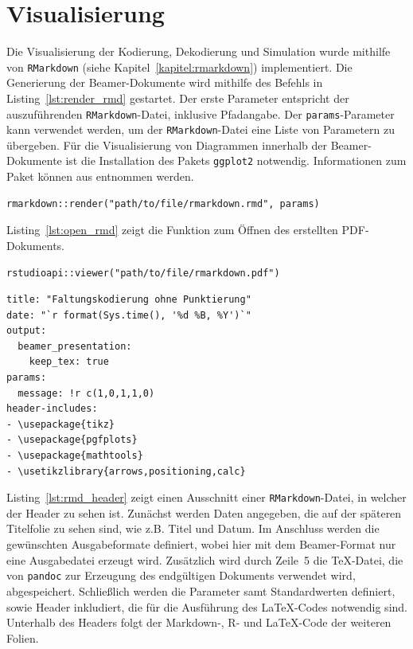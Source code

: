 \section{Visualisierung}
\label{kapitel:implementierung_visualisierung}
Die Visualisierung der Kodierung, Dekodierung und Simulation wurde mithilfe von \texttt{RMarkdown} (siehe Kapitel~\ref{kapitel:rmarkdown}) implementiert. Die Generierung der Beamer-Dokumente wird mithilfe des Befehls in Listing~\ref{lst:render_rmd} gestartet. Der erste Parameter entspricht der auszuführenden \texttt{RMarkdown}-Datei, inklusive Pfadangabe. Der \texttt{params}-Parameter kann verwendet werden, um der \texttt{RMarkdown}-Datei eine Liste von Parametern zu übergeben. Für die Visualisierung von Diagrammen innerhalb der Beamer-Dokumente ist die Installation des Pakets \texttt{ggplot2} notwendig. Informationen zum Paket können aus \cite{ggplot2} entnommen werden.
\begin{lstlisting}[caption=Erzeugen des Visualisierungs-Dokuments aus der RMD-Datei, label={lst:render_rmd}, float=!th]
rmarkdown::render("path/to/file/rmarkdown.rmd", params)
\end{lstlisting}
Listing~\ref{lst:open_rmd} zeigt die Funktion zum Öffnen des erstellten PDF-Dokuments.
\begin{lstlisting}[caption=Öffnen des Visualisierungs-Dokuments, label={lst:open_rmd}, float=!th]
rstudioapi::viewer("path/to/file/rmarkdown.pdf")
\end{lstlisting}

\begin{lstlisting}[caption=RMarkdown Header, label={lst:rmd_header}, float=!th]
title: "Faltungskodierung ohne Punktierung"
date: "`r format(Sys.time(), '%d %B, %Y')`"
output:
  beamer_presentation:
    keep_tex: true
params:
  message: !r c(1,0,1,1,0)
header-includes:
- \usepackage{tikz}
- \usepackage{pgfplots}
- \usepackage{mathtools}
- \usetikzlibrary{arrows,positioning,calc}
\end{lstlisting}
Listing~\ref{lst:rmd_header} zeigt einen Ausschnitt einer \texttt{RMarkdown}-Datei, in welcher der Header zu sehen ist. Zunächst werden Daten angegeben, die auf der späteren Titelfolie zu sehen sind, wie z.B. Titel und Datum. Im Anschluss werden die gewünschten Ausgabeformate definiert, wobei hier mit dem Beamer-Format nur eine Ausgabedatei erzeugt wird. Zusätzlich wird durch Zeile~5 die \TeX -Datei, die von \texttt{pandoc} zur Erzeugung des endgültigen Dokuments verwendet wird, abgespeichert. Schließlich werden die Parameter samt Standardwerten definiert, sowie Header inkludiert, die für die Ausführung des \LaTeX -Codes notwendig sind. Unterhalb des Headers folgt der Markdown-, R- und \LaTeX -Code der weiteren Folien.~\cite{rmarkdown}
